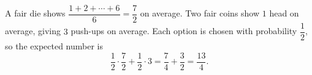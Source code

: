 A fair die shows $\dfrac{1+2+\cdots+6}{6}=\dfrac72$ on average. Two fair coins show $1$ head on average, giving $3$ push-ups on average. Each option is chosen with probability $\dfrac12$, so the expected number is
\[\dfrac12\cdot\dfrac72+\dfrac12\cdot3=\dfrac74+\dfrac32=\boxed{\dfrac{13}{4}}.\]
